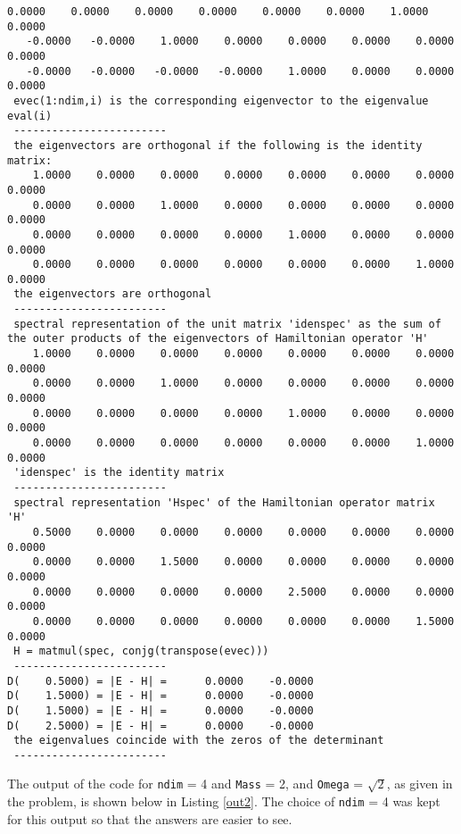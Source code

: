 \documentclass[12pt]{article}
\begin{document}
\begin{lstlisting}[frame=single,caption={Output of {\tt Fortran 90} Code {\tt hrmosc.f90} with {\tt ndim} = 4, {\tt Mass} = {\tt Omega} = 1},label=out1]
    0.0000    0.0000    0.0000    0.0000    0.0000    0.0000    1.0000    0.0000
   -0.0000   -0.0000    1.0000    0.0000    0.0000    0.0000    0.0000    0.0000
   -0.0000   -0.0000   -0.0000   -0.0000    1.0000    0.0000    0.0000    0.0000
 evec(1:ndim,i) is the corresponding eigenvector to the eigenvalue eval(i)
 ------------------------
 the eigenvectors are orthogonal if the following is the identity matrix:
    1.0000    0.0000    0.0000    0.0000    0.0000    0.0000    0.0000    0.0000
    0.0000    0.0000    1.0000    0.0000    0.0000    0.0000    0.0000    0.0000
    0.0000    0.0000    0.0000    0.0000    1.0000    0.0000    0.0000    0.0000
    0.0000    0.0000    0.0000    0.0000    0.0000    0.0000    1.0000    0.0000
 the eigenvectors are orthogonal
 ------------------------
 spectral representation of the unit matrix 'idenspec' as the sum of the outer products of the eigenvectors of Hamiltonian operator 'H'
    1.0000    0.0000    0.0000    0.0000    0.0000    0.0000    0.0000    0.0000
    0.0000    0.0000    1.0000    0.0000    0.0000    0.0000    0.0000    0.0000
    0.0000    0.0000    0.0000    0.0000    1.0000    0.0000    0.0000    0.0000
    0.0000    0.0000    0.0000    0.0000    0.0000    0.0000    1.0000    0.0000
 'idenspec' is the identity matrix
 ------------------------
 spectral representation 'Hspec' of the Hamiltonian operator matrix 'H'
    0.5000    0.0000    0.0000    0.0000    0.0000    0.0000    0.0000    0.0000
    0.0000    0.0000    1.5000    0.0000    0.0000    0.0000    0.0000    0.0000
    0.0000    0.0000    0.0000    0.0000    2.5000    0.0000    0.0000    0.0000
    0.0000    0.0000    0.0000    0.0000    0.0000    0.0000    1.5000    0.0000
 H = matmul(spec, conjg(transpose(evec)))
 ------------------------
D(    0.5000) = |E - H| =      0.0000    -0.0000
D(    1.5000) = |E - H| =      0.0000    -0.0000
D(    1.5000) = |E - H| =      0.0000    -0.0000
D(    2.5000) = |E - H| =      0.0000    -0.0000
 the eigenvalues coincide with the zeros of the determinant
 ------------------------

\end{lstlisting}

The output of the code for {\tt ndim} = 4 and {\tt Mass} = 2, and {\tt Omega} = $\sqrt{2}$, as given in the problem, is shown below in Listing \ref{out2}.  The choice of {\tt ndim} = 4 was kept for this output so that the answers are easier to see.
\end{document}
